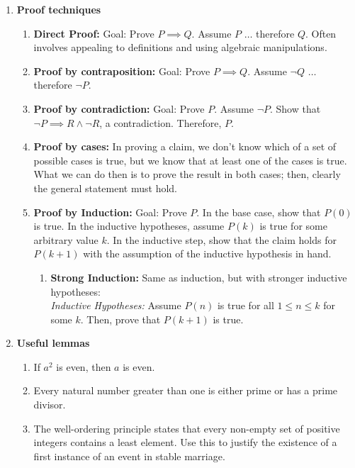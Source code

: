 \documentclass[10pt]{article}
\begin{document}
\begin{multicols}{2}
\begin{enumerate}
    \item \textbf{Proof techniques}
    \begin{enumerate}
        \item \textbf{Direct Proof:} Goal: Prove $P \implies Q$. Assume $P$ $\hdots$ therefore $Q$. Often involves appealing to definitions and using algebraic manipulations.
        \item \textbf{Proof by contraposition:} Goal: Prove $P \implies Q$. Assume $\neg Q$ $\hdots$ therefore $\neg P$.
        \item \textbf{Proof by contradiction:} Goal: Prove $P$. Assume $\neg P$. Show that $\neg P \implies R \land \neg R$, a contradiction. Therefore, $P$.
        \item \textbf{Proof by cases:} In proving a claim, we don’t know which of a set of possible cases is true, but we know that at least one of the cases is true. What we can do then is to prove the result in both cases; then, clearly the general statement must hold.
        \item \textbf{Proof by Induction:} Goal: Prove $P$. In the base case, show that $P(0)$ is true. In the inductive hypotheses, assume $P(k)$ is true for some arbitrary value $k$. In the inductive step, show that the claim holds for $P(k+1)$ with the assumption of the inductive hypothesis in hand. 
        \begin{enumerate}
            \item \textbf{Strong Induction:} Same as induction, but with stronger inductive hypotheses: \\
            \textit{Inductive Hypotheses:} Assume $P(n)$ is true for all $1 \leq n \leq k$ for some $k$. Then, prove that $P(k+1)$ is true.
        \end{enumerate}
    \end{enumerate}
    
    \item \textbf{Useful lemmas}
    \begin{enumerate}
        \item If $a^2$ is even, then $a$ is even.
        \item Every natural number greater than one is either prime or has a prime divisor.
        \item The well-ordering principle states that every non-empty set of positive integers contains a least element. Use this to justify the existence of a first instance of an event in stable marriage.
    \end{enumerate}
    

\end{enumerate}
\end{multicols}
\end{document}
